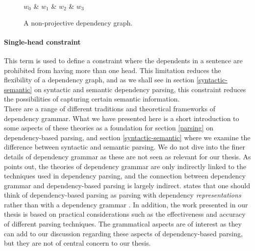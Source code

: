 \begin{figure}
    \centering
    \begin{dependency}
        \begin{deptext}[column sep=1em, row sep=.1ex]
        $w_0$ \& $w_1$ \& $w_2$ \& $w_3$ \\    
        \end{deptext}
    \end{dependency}
    \caption{A non-projective dependency graph.}
    \label{non-projective}
\end{figure}

\paragraph{Single-head constraint} This term is used to define a constraint where the dependents in a sentence are prohibited from having more than one head. This limitation reduces the flexibility of a dependency graph, and as we shall see in section \ref{syntactic-semantic} on syntactic and semantic dependency parsing, this constraint reduces the possibilities of capturing certain semantic information.\\

There are a range of different traditions and theoretical frameworks of dependency grammar. What we have presented here is a short introduction to some aspects of these theories as a foundation for section \ref{parsing} on dependency-based parsing, and section \ref{syntactic-semantic} where we examine the difference between syntactic and semantic parsing. We do not dive into the finer details of dependency grammar as these are not seen as relevant for our thesis. As \citeauthor{Niv:05} points out, the theories of dependency grammar are only indirectly linked to the techniques used in dependency parsing, and the connection between dependency grammar and dependency-based parsing is largely indirect. \citeauthor{Niv:05} states that one should think of dependency-based parsing as parsing with dependency \textit{representations} rather than with a dependency grammar \cite{Niv:05}. In addition, the work presented in our thesis is based on practical considerations such as the effectiveness and accuracy of different parsing techniques. The grammatical aspects are of interest as they can add to our discussion regarding these aspects of dependency-based parsing, but they are not of central concern to our thesis.

